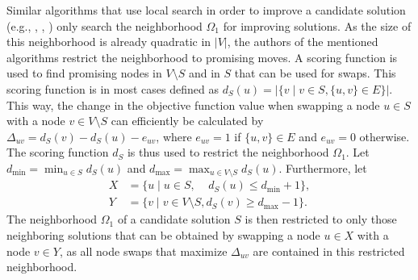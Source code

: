 \documentclass[draft,final]{vutinfth} %
\begin{document}
Similar algorithms that use local search in order to improve a candidate solution (e.g.,  \cite{chen_nuqclq_2021}, \cite{djeddi_extension_2019}, \cite{zhou_opposition-based_2020}) only search the neighborhood $\Omega_1$ for improving solutions. As the size of this neighborhood is already quadratic in $|V|$, the authors of the mentioned algorithms restrict the neighborhood to promising moves. A scoring function is used to find promising nodes in $V \setminus S$ and in $S$ that can be used for swaps. This scoring function is in most cases defined as $d_S(u) = |\{v \mid v \in S, \{u,v\} \in E \}|$. This way, the change in the objective function value when swapping a node $u \in S$ with a node $v \in V \setminus S$ can efficiently be calculated by $\Delta_{uv} = d_S(v) - d_S(u) - e_{uv}$, where $e_{uv} = 1$ if $\{u,v\} \in E$ and $e_{uv} = 0$ otherwise. 
The scoring function $d_S$ is thus used to restrict the neighborhood $\Omega_1$. 
Let $d_{\min} = \min_{u \in S} d_S(u)$ and $d_{\max} = \max_{u \in V \setminus S} d_S(u)$.
Furthermore, let 
\begin{align*}
    X &= \{ u \mid u \in S,~~~~~ d_S(u) \leq d_{\min} + 1 \}, \\
    Y &= \{ v \mid v \in V \setminus S, d_S(v) \geq d_{\max} - 1 \}.
\end{align*} The neighborhood $\Omega_1$ of a candidate solution $S$ is then restricted to only those neighboring solutions that can be obtained by swapping a node $u \in X$ with a node $v \in Y$, as all node swaps that maximize $\Delta_{uv}$ are contained in this restricted neighborhood. 
\end{document}
